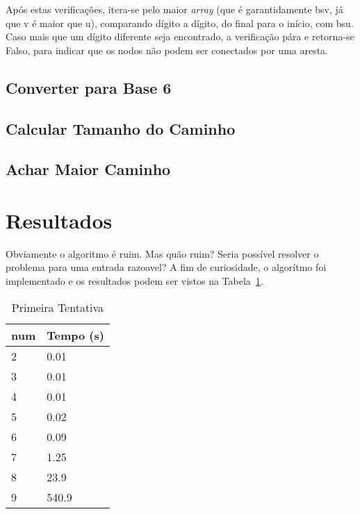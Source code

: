 \documentclass[12pt]{article}
\begin{document}
Após estas verifica\c{c}ões, itera-se pelo maior \textit{array} (que é garantidamente {\sf bsv}, já que {\sf v} é maior que {\sf u}), comparando dígito a dígito, do final para o início, com {\sf bsu}. Caso mais que um dígito diferente seja encontrado, a verifica\c{c}ão pára e retorna-se Falso, para indicar que os nodos não podem ser conectados por uma aresta.

\subsection{Converter para Base 6}\label{sec:algoritmos:base6}

\subsection{Calcular Tamanho do Caminho}\label{sec:algoritmos:calcular-tamanho-caminhos}

\subsection{Achar Maior Caminho}\label{sec:algoritmos:achar-maior-caminho}

\section{Resultados}\label{sec:resultados}
Obviamente o algoritmo é ruim. Mas quão ruim? Seria possível resolver o problema para uma entrada razoavel? A fim de curiosidade, o algorítmo foi implementado e os resultados podem ser vistos na Tabela~\ref{tab:resultados-1}.

\begin{table}[h]
\caption{Primeira Tentativa}
\label{tab:resultados-1}
\begin{tabular}{ll}
  {\sf num} & Tempo (s) \\
  \hline
  2 & 0.01 \\
  3 & 0.01 \\
  4 & 0.01 \\
  5 & 0.02 \\
  6 & 0.09 \\
  7 & 1.25 \\
  8 & 23.9 \\
  9 & 540.9    
\end{tabular}
\end{table}
\end{document}
